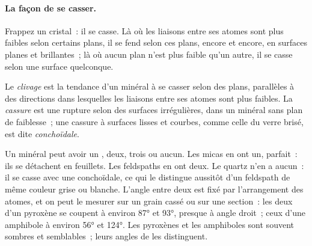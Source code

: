 \paragraph{La façon de se casser.} Frappez un cristal~: il se casse. Là où
les liaisons entre ses atomes sont plus faibles selon certains plans, il se
fend selon ces plans, encore et encore, en surfaces planes et brillantes~;
là où aucun plan n'est plus faible qu'un autre, il se casse selon une
surface quelconque.

\begin{definition}\label{def:g11:minerals:cleavage}
Le \emph{clivage} est
la tendance d'un minéral à se casser selon des plans, parallèles à des
directions dans lesquelles les liaisons entre ses atomes sont plus faibles.
La \emph{cassure} est
une rupture selon des surfaces irrégulières, dans un minéral sans plan de
faiblesse~; une cassure à surfaces lisses et courbes, comme celle du verre
brisé, est dite \emph{conchoïdale}.
\end{definition}

Un minéral peut avoir un , deux, trois ou aucun. Les micas en ont un,
parfait~: ils se détachent en feuillets. Les feldspaths en ont deux. Le
quartz n'en a aucun~: il se casse avec une  conchoïdale, ce qui le
distingue aussitôt d'un feldspath de même couleur grise ou blanche. L'angle
entre deux  est fixé par l'arrangement des atomes, et on peut le
mesurer sur un grain cassé ou sur une section~: les deux  d'un
pyroxène se coupent à environ \ang{87} et \ang{93}, presque à angle droit~;
ceux d'une amphibole à environ \ang{56} et \ang{124}. Les pyroxènes et les
amphiboles sont souvent sombres et semblables~; leurs angles de  les
distinguent.

